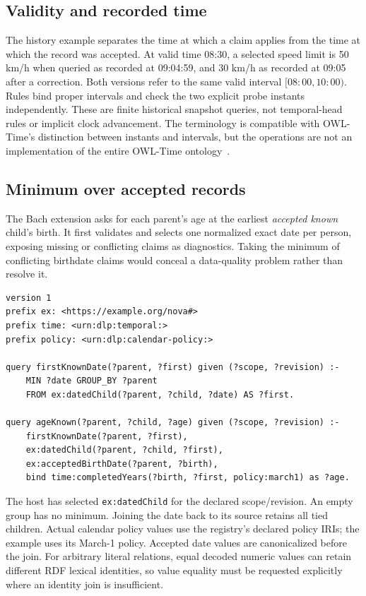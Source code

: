 \documentclass{article}
\newcommand{\code}[1]{\texttt{#1}}
\begin{document}
\subsection{Validity and recorded time}
The history example separates the time at which a claim applies from the time
at which the record was accepted. At valid time 08:30, a selected speed limit
is 50 km/h when queried as recorded at 09:04:59, and 30 km/h as recorded at
09:05 after a correction. Both versions refer to the same valid interval
$[08{:}00,10{:}00)$. Rules bind proper intervals and check the two explicit
probe instants independently. These are finite historical snapshot queries,
not temporal-head rules or implicit clock advancement. The terminology is
compatible with OWL-Time's distinction between instants and intervals, but
the operations are not an implementation of the entire OWL-Time
ontology~\cite{owltime2017}.

\subsection{Minimum over accepted records}
The Bach extension asks for each parent's age at the earliest \emph{accepted
known} child's birth. It first validates and selects one normalized exact date
per person, exposing missing or conflicting claims as diagnostics. Taking the
minimum of conflicting birthdate claims would conceal a data-quality problem
rather than resolve it.

\begin{lstlisting}
version 1
prefix ex: <https://example.org/nova#>
prefix time: <urn:dlp:temporal:>
prefix policy: <urn:dlp:calendar-policy:>

query firstKnownDate(?parent, ?first) given (?scope, ?revision) :-
    MIN ?date GROUP_BY ?parent
    FROM ex:datedChild(?parent, ?child, ?date) AS ?first.

query ageKnown(?parent, ?child, ?age) given (?scope, ?revision) :-
    firstKnownDate(?parent, ?first),
    ex:datedChild(?parent, ?child, ?first),
    ex:acceptedBirthDate(?parent, ?birth),
    bind time:completedYears(?birth, ?first, policy:march1) as ?age.
\end{lstlisting}
The host has selected \code{ex:datedChild} for the declared scope/revision.
An empty group has no minimum. Joining the date back to its source retains all
tied children. Actual calendar policy values use the registry's declared policy
IRIs; the example uses its March-1 policy. Accepted date values are canonicalized
before the join. For arbitrary literal relations, equal decoded numeric values
can retain different RDF lexical identities, so value equality must be requested
explicitly where an identity join is insufficient.
\end{document}
